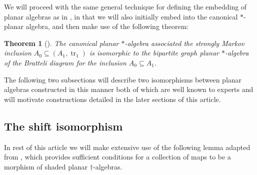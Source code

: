 \documentclass[11pt]{article}
\theoremstyle{plain}
\newtheorem{thm}{Theorem}[section]
\theoremstyle{definition}
\DeclareMathOperator{\tr}{tr}
\begin{document}
We will proceed with the same general technique for defining the embedding of planar algebras as in \cite{MR2812459}, in that we will also initially embed into the canonical $\ast$-planar algebra, and then make use of the following theorem:

\begin{thm}[\cite{MR2812459}] \label{planaralgebraisomorphism}
The canonical planar $\ast$-algebra associated the strongly Markov inclusion $A_0\subseteq (A_1,\tr_1)$ is isomorphic to the bipartite graph planar $\ast$-algebra of the Bratteli diagram for the inclusion $A_0\subseteq A_1$.
\end{thm}

The following two subsections will describe two isomorphisms between planar algebras constructed in this manner both of which are well known to experts and will motivate constructions detailed in the later sections of this article.

\subsection{The shift isomorphism} 

In rest of this article we will make extensive use of the following lemma adapted from \cite[Lem.~2.49]{MR2812459}, which provides sufficient conditions for a collection of maps to be a morphism of shaded planar $\dag$-algebras.
\end{document}
